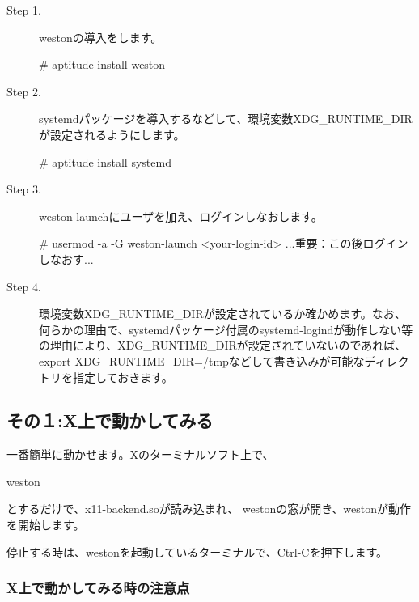 \documentclass[mingoth,a4paper]{jsarticle}
\begin{document}
\begin{description}
\item [Step 1.] westonの導入をします。
\begin{commandline}
# aptitude install weston
\end{commandline}
\item [Step 2.] systemdパッケージを導入するなどして、環境変数XDG\_RUNTIME\_DIRが設定されるようにします。
\begin{commandline}
# aptitude install systemd
\end{commandline}
\item [Step 3.] weston-launchにユーザを加え、ログインしなおします。
\begin{commandline}
# usermod -a -G weston-launch <your-login-id>
...重要：この後ログインしなおす...
\end{commandline}
\item [Step 4.] 環境変数XDG\_RUNTIME\_DIRが設定されているか確かめます。なお、何らかの理由で、systemdパッケージ付属のsystemd-logindが動作しない等の理由により、XDG\_RUNTIME\_DIRが設定されていないのであれば、export XDG\_RUNTIME\_DIR=/tmpなどして書き込みが可能なディレクトリを指定しておきます。
\end{description}

\subsection{その１:X上で動かしてみる}

 一番簡単に動かせます。Xのターミナルソフト上で、

\begin{commandline}
weston
\end{commandline}

とするだけで、x11-backend.soが読み込まれ、
westonの窓が開き、westonが動作を開始します。

停止する時は、westonを起動しているターミナルで、Ctrl-Cを押下します。

\subsubsection{X上で動かしてみる時の注意点}
\end{document}
